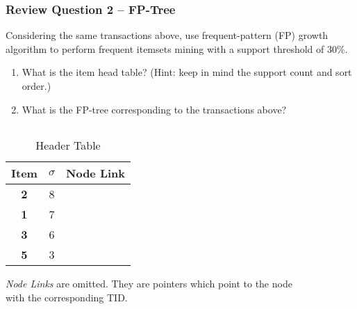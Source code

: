 \documentclass[aspectratio=169, 10pt]{beamer}
\begin{document}
\begin{frame}[t]
\frametitle{Review Question 2 -- FP-Tree}
\small

Considering the same transactions above, use frequent-pattern (FP) growth algorithm to perform frequent itemsets mining with a support threshold of 30\%.

\begin{enumerate}
    \item What is the item head table? (Hint: keep in mind the support count and sort order.)
    \item What is the FP-tree corresponding to the transactions above?
\end{enumerate}

\begin{columns}
    \begin{column}{0.5\textwidth} 
        \begin{table}[]
            \begin{tabular}{c|c|c}
                Item      & $\sigma$  & Node Link \\ \hline
                \textbf{2}         & 8         &           \\
                \textbf{1}         & 7         &           \\
                \textbf{3}         & 6         &           \\
                \textbf{5}         & 3         &           \\
            \end{tabular}
            \caption{Header Table}
        \end{table}

        \textit{Node Links} are omitted. They are pointers which point to the node with the corresponding TID.

    \end{column}
    \begin{column}{0.5\textwidth} %
        \begin{figure}
            \center
\end{figure}
\end{column}
\end{columns}
\end{frame}
\end{document}
